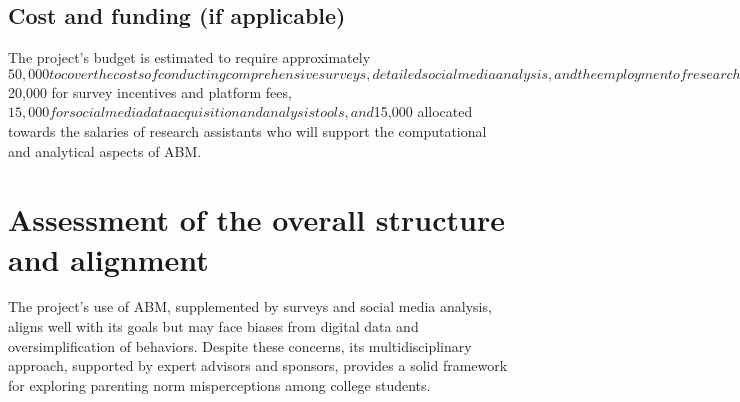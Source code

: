 \documentclass{article}
\begin{document}
\subsection*{Cost and funding (if applicable)}
The project's budget is estimated to require approximately $50,000 to cover the costs of conducting comprehensive surveys, detailed social media analysis, and the employment of research assistants for Agent-Based Modeling (ABM) simulations. This revised estimate includes $20,000 for survey incentives and platform fees, $15,000 for social media data acquisition and analysis tools, and $15,000 allocated towards the salaries of research assistants who will support the computational and analytical aspects of ABM.


\section*{Assessment of the overall structure and alignment}
The project's use of ABM, supplemented by surveys and social media analysis, aligns well with its goals but may face biases from digital data and oversimplification of behaviors. Despite these concerns, its multidisciplinary approach, supported by expert advisors and sponsors, provides a solid framework for exploring parenting norm misperceptions among college students.
\end{document}
